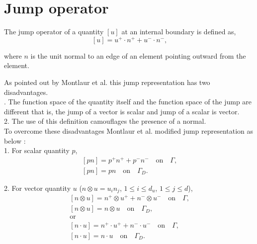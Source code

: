 \documentclass[a4paper,twoside,openright]{book}
\begin{document}
\section{Jump operator} \label{jump_operator_ch3}

The jump operator of a quantity $[u]$ at an internal boundary is defined as,
\begin{equation}\label{jump operator}
[u]=u^+ \cdot n^+ + u^- \cdot n^- \textrm{,}
\end{equation}

where $n$ is the unit normal to an edge of an element pointing outward from the element.

As pointed out by Montlaur et al. \cite{Montlaur2} this jump representation has two disadvantages.\\
. The function space of the quantity itself and the function space of the jump are different that is, the jump of a vector is scalar and jump of a scalar is vector.\\
2. The use of this definition camouflages the presence of a normal.\\

To overcome these disadvantages Montlaur et al. \cite{Montlaur2} modified jump representation as below :\\

1.  For scalar quantity $p$,
\begin{equation}
\begin{split}
[pn] = p^+ n^+ + p^- n^- \quad \textrm{on} \quad \Gamma \textrm{,}\\
[pn] = p n \quad \textrm{on} \quad \Gamma_D \textrm{.}
\end{split}
\end{equation}

2. For vector quantity $u$ ($n \otimes u = u_i n_j$, $1 \leq i \leq d_u$, $1 \leq j \leq d$),
\begin{equation}
\begin{split}
[n \otimes u] = n^+ \otimes u^+ + n^- \otimes u^- \quad \textrm{on} \quad \Gamma \textrm{,}\\
[n \otimes u] = n \otimes u \quad \textrm{on} \quad \Gamma_D \textrm{,}\\
 \textrm{or} \\
[n \cdot u] = n^+ \cdot u^+ + n^- \cdot u^- \quad \textrm{on} \quad \Gamma \textrm{,}\\
[n \cdot u] = n \cdot u \quad \textrm{on} \quad \Gamma_D \textrm{.}\\
\end{split}
\end{equation}
\end{document}

